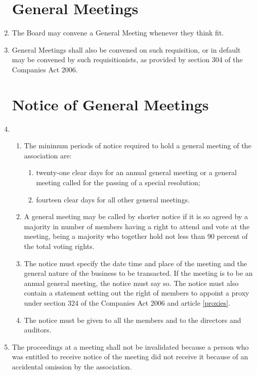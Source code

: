 \begin{enumerate}
\section{General Meetings}
\item
    The Board may convene a General Meeting whenever they think fit.

\item
    General Meetings shall also be convened on such requisition, or in default may be convened by such
    requisitionists, as provided by section 304 of the Companies Act 2006.

\section{Notice of General Meetings}

\item
  \begin{enumerate}
  \item
    The minimum periods of notice required to hold a general meeting of
    the association are:
    \begin{enumerate}
    \item
      twenty-one clear days for an annual general meeting or a general
      meeting called for the passing of a special resolution;
    \item
      fourteen clear days for all other general meetings.
    \end{enumerate}
  \item
    A general meeting may be called by shorter notice if it is so
    agreed by a majority in number of members having a right to attend
    and vote at the meeting, being a majority who together hold not
    less than 90 percent of the total voting rights.
  \item
    The notice must specify the date time and place of the meeting and
    the general nature of the business to be transacted. If the meeting
    is to be an annual general meeting, the notice must say so. The
    notice must also contain a statement setting out the right of
    members to appoint a proxy under section 324 of the Companies Act
    2006 and article \ref{proxies}.
  \item
    The notice must be given to all the members and to the directors
    and auditors.
  \end{enumerate}

\item
  The proceedings at a meeting shall not be invalidated because a
  person who was entitled to receive notice of the meeting did not
  receive it because of an accidental omission by the association.


\end{enumerate}
